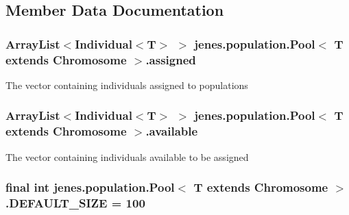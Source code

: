 \subsection{Member Data Documentation}
\hypertarget{classjenes_1_1population_1_1_pool_3_01_t_01extends_01_chromosome_01_4_ad2c4f47aa6c1d8e54b7c9e67a6a86177}{
\subsubsection[{assigned}]{\setlength{\rightskip}{0pt plus 5cm}Array\-List$<$Individual$<$T$>$ $>$ jenes.\-population.\-Pool$<$ T extends Chromosome $>$.assigned\hspace{0.3cm}{\ttfamily [private]}}}\label{classjenes_1_1population_1_1_pool_3_01_t_01extends_01_chromosome_01_4_ad2c4f47aa6c1d8e54b7c9e67a6a86177}
The vector containing individuals assigned to populations \hypertarget{classjenes_1_1population_1_1_pool_3_01_t_01extends_01_chromosome_01_4_a9a8de53b6e167a6ce8f13b3f73d2ffd2}{
\subsubsection[{available}]{\setlength{\rightskip}{0pt plus 5cm}Array\-List$<$Individual$<$T$>$ $>$ jenes.\-population.\-Pool$<$ T extends Chromosome $>$.available\hspace{0.3cm}{\ttfamily [private]}}}\label{classjenes_1_1population_1_1_pool_3_01_t_01extends_01_chromosome_01_4_a9a8de53b6e167a6ce8f13b3f73d2ffd2}
The vector containing individuals available to be assigned \hypertarget{classjenes_1_1population_1_1_pool_3_01_t_01extends_01_chromosome_01_4_a7495db191e994037e32f9869c83db6b3}{
\subsubsection[{D\-E\-F\-A\-U\-L\-T\-\_\-\-S\-I\-Z\-E}]{\setlength{\rightskip}{0pt plus 5cm}final int jenes.\-population.\-Pool$<$ T extends Chromosome $>$.D\-E\-F\-A\-U\-L\-T\-\_\-\-S\-I\-Z\-E = 100\hspace{0.3cm}{\ttfamily [static]}}}\label{classjenes_1_1population_1_1_pool_3_01_t_01extends_01_chromosome_01_4_a7495db191e994037e32f9869c83db6b3}
